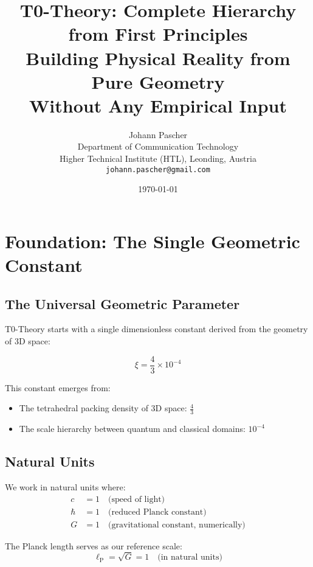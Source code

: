 \documentclass[12pt,a4paper]{article}
\title{\textbf{T0-Theory: Complete Hierarchy from First Principles}\\[0.5cm]
	\large Building Physical Reality from Pure Geometry\\[0.3cm]
	\normalsize Without Any Empirical Input}
\author{Johann Pascher\\
	Department of Communication Technology\\
	Higher Technical Institute (HTL), Leonding, Austria\\
	\texttt{johann.pascher@gmail.com}}
\date{\today}
\newcommand{\lP}{\ell_{\text{P}}}
\newcommand{\xipar}{\xi}  %
\begin{document}
	\maketitle
	\tableofcontents
	\newpage
	
	\section{Foundation: The Single Geometric Constant}
	
	\subsection{The Universal Geometric Parameter}
	
	T0-Theory starts with a single dimensionless constant derived from the geometry of 3D space:
	
	\begin{keyresult}
		\begin{equation}
			\boxed{\xipar = \frac{4}{3} \times 10^{-4}}
		\end{equation}
	\end{keyresult}
	
	This constant emerges from:
	\begin{itemize}
		\item The tetrahedral packing density of 3D space: $\frac{4}{3}$
		\item The scale hierarchy between quantum and classical domains: $10^{-4}$
	\end{itemize}
	
	\subsection{Natural Units}
	We work in natural units where:
	\begin{align}
		c &= 1 \quad \text{(speed of light)} \\
		\hbar &= 1 \quad \text{(reduced Planck constant)} \\
		G &= 1 \quad \text{(gravitational constant, numerically)}
	\end{align}
	
	The Planck length serves as our reference scale:
	\begin{equation}
		\lP = \sqrt{G} = 1 \quad \text{(in natural units)}
	\end{equation}
	
\end{document}
